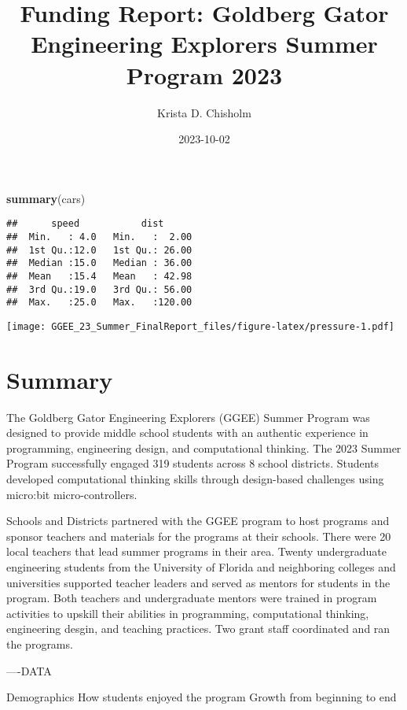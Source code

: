 \documentclass[
]{article}
\title{Funding Report: Goldberg Gator Engineering Explorers Summer
Program 2023}
\author{Krista D. Chisholm}
\date{2023-10-02}
\newenvironment{Shaded}{\begin{snugshade}}{\end{snugshade}}
\newcommand{\FunctionTok}[1]{\textcolor[rgb]{0.13,0.29,0.53}{\textbf{#1}}}
\newcommand{\NormalTok}[1]{#1}
\begin{document}
\maketitle

{
\setcounter{tocdepth}{2}
\tableofcontents
}
\begin{Shaded}
\begin{Highlighting}[]
\FunctionTok{summary}\NormalTok{(cars)}
\end{Highlighting}
\end{Shaded}

\begin{verbatim}
##      speed           dist       
##  Min.   : 4.0   Min.   :  2.00  
##  1st Qu.:12.0   1st Qu.: 26.00  
##  Median :15.0   Median : 36.00  
##  Mean   :15.4   Mean   : 42.98  
##  3rd Qu.:19.0   3rd Qu.: 56.00  
##  Max.   :25.0   Max.   :120.00
\end{verbatim}

\texttt{[image: GGEE\_23\_Summer\_FinalReport\_files/figure-latex/pressure-1.pdf]}

\hypertarget{summary}{%
\section{Summary}\label{summary}}

The Goldberg Gator Engineering Explorers (GGEE) Summer Program was
designed to provide middle school students with an authentic experience
in programming, engineering design, and computational thinking. The 2023
Summer Program successfully engaged 319 students across 8 school
districts. Students developed computational thinking skills through
design-based challenges using micro:bit micro-controllers.

Schools and Districts partnered with the GGEE program to host programs
and sponsor teachers and materials for the programs at their schools.
There were 20 local teachers that lead summer programs in their area.
Twenty undergraduate engineering students from the University of Florida
and neighboring colleges and universities supported teacher leaders and
served as mentors for students in the program. Both teachers and
undergraduate mentors were trained in program activities to upskill
their abilities in programming, computational thinking, engineering
desgin, and teaching practices. Two grant staff coordinated and ran the
programs.

----DATA

Demographics How students enjoyed the program Growth from beginning to
end
\end{document}

